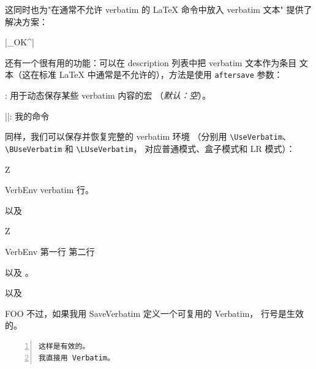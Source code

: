\documentclass[twoside]{article}
\newcommand\cs[1]{\texttt{\textbackslash#1}}
\providecommand\optname[1]{\textsf{#1}}
\newenvironment{optlist}{\begin{description}%
  \renewcommand\makelabel[1]{%
    \descriptionlabel{\mdseries\optname{##1}}}%
  \itemsep0.25\itemsep}%
 {\end{description}}
\begin{document}
  这同时也为"在通常不允许 verbatim 的 \LaTeX{} 命令中放入 verbatim 文本"
提供了解决方案：

{
\begin{Example}
  \DefineShortVerb{\|}|_OK^| 
\end{Example}
}

  还有一个很有用的功能：可以在 description 列表中把 verbatim 文本作为条目
文本（这在标准 \LaTeX{} 中通常是不允许的），方法是使用
\texttt{aftersave} 参数：

\begin{optlist}
  \item[aftersave (macro)]: 用于动态保存某些 verbatim 内容的宏
  （\emph{默认：空}）。
\end{optlist}

\begin{SideBySideExample}
  \newcommand{\Vitem}{%
    }
  \DefineShortVerb{\|}
  \begin{description}
    \Vitem|\MyCommand|: 我的命令
  \end{description}
\end{SideBySideExample}

  同样，我们可以保存并恢复完整的 verbatim 环境
（分别用 \cs{UseVerbatim}、\cs{BUseVerbatim} 和 \cs{LUseVerbatim}，
对应普通模式、盒子模式和 LR 模式）：

\begin{SideBySideExample}
  Z
  \begin{SaveVerbatim}{VerbEnv}
    verbatim 行。
  \end{SaveVerbatim}
  以及 
\end{SideBySideExample}

\begin{SideBySideExample}
  Z
  \begin{SaveVerbatim}[gobble=5]{VerbEnv}
    第一行
    第二行
  \end{SaveVerbatim}

  以及 。

   以及
\end{SideBySideExample}


\begin{SideBySideExample}
\begin{SaveVerbatim}{FOO}
不过，如果我用 SaveVerbatim
定义一个可复用的 Verbatim，
行号是生效的。
\end{SaveVerbatim}

\begin{Verbatim}[numbers=left]
这样是有效的。
我直接用 Verbatim。
\end{Verbatim}

\end{SideBySideExample}
\end{document}
